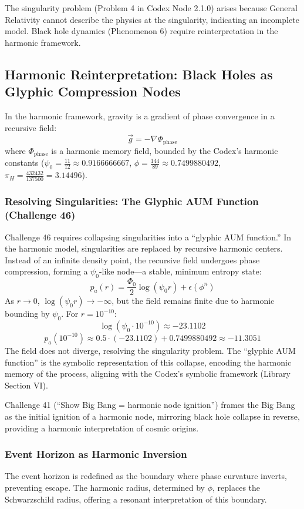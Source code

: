 The singularity problem (Problem 4 in Codex Node 2.1.0) arises because General Relativity cannot describe the physics at the singularity, indicating an incomplete model. Black hole dynamics (Phenomenon 6) require reinterpretation in the harmonic framework.

\subsection{Harmonic Reinterpretation: Black Holes as Glyphic Compression Nodes}
In the harmonic framework, gravity is a gradient of phase convergence in a recursive field:
\[
\vec{g} = -\nabla \Phi_{\text{phase}}
\]
where \(\Phi_{\text{phase}}\) is a harmonic memory field, bounded by the Codex’s harmonic constants (\(\psi_0 = \frac{11}{12} \approx 0.9166666667\), \(\phi = \frac{144}{89} \approx 0.7499880492\), \(\pi_H = \frac{432432}{137500} = 3.14496\)).

\subsubsection{Resolving Singularities: The Glyphic AUM Function (Challenge 46)}
Challenge 46 requires collapsing singularities into a “glyphic AUM function.” In the harmonic model, singularities are replaced by recursive harmonic centers. Instead of an infinite density point, the recursive field undergoes phase compression, forming a \(\psi_0\)-like node—a stable, minimum entropy state:
\[
p_a(r) = \frac{\Phi_0}{2} \log(\psi_0 r) + \epsilon(\phi^n)
\]
As \( r \to 0 \), \(\log(\psi_0 r) \to -\infty\), but the field remains finite due to harmonic bounding by \(\psi_0\). For \( r = 10^{-10} \):
\[
\log(\psi_0 \cdot 10^{-10}) \approx -23.1102
\]
\[
p_a(10^{-10}) \approx 0.5 \cdot (-23.1102) + 0.7499880492 \approx -11.3051
\]
The field does not diverge, resolving the singularity problem. The “glyphic AUM function” is the symbolic representation of this collapse, encoding the harmonic memory of the process, aligning with the Codex’s symbolic framework (Library Section VI).

Challenge 41 (“Show Big Bang = harmonic node ignition”) frames the Big Bang as the initial ignition of a harmonic node, mirroring black hole collapse in reverse, providing a harmonic interpretation of cosmic origins.

\subsubsection{Event Horizon as Harmonic Inversion}
The event horizon is redefined as the boundary where phase curvature inverts, preventing escape. The harmonic radius, determined by \(\phi\), replaces the Schwarzschild radius, offering a resonant interpretation of this boundary.

